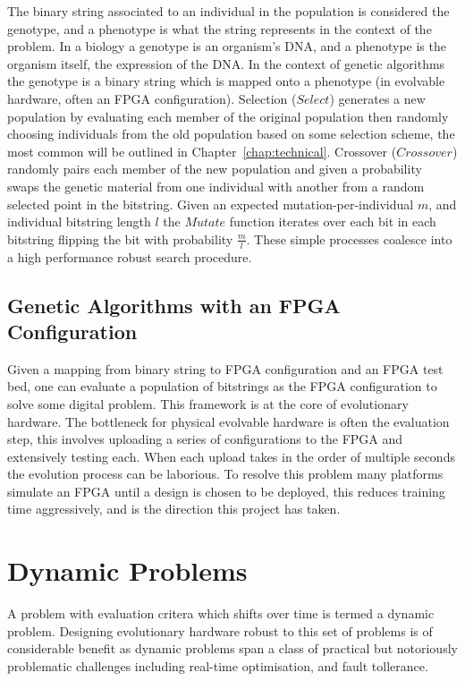 The binary string associated to an individual in the
population is considered the genotype, and a phenotype is what the string represents in the
context of the problem. In a biology a genotype is an organism's DNA, and a phenotype is
the organism itself, the expression of the DNA. In the context of genetic algorithms
the genotype is a binary string which is mapped onto a phenotype (in evolvable
hardware, often an FPGA configuration).
Selection ($Select$) generates a new population by evaluating each member of the
original population then
randomly choosing individuals from the old population based on some selection scheme,
the most common will be outlined in Chapter~\ref{chap:technical}.
Crossover ($Crossover$) randomly pairs each member of the new population
and given a probability swaps the genetic material from one individual with another from a
random selected point in the bitstring. Given an expected mutation-per-individual $m$, and
individual bitstring length
$l$ the $Mutate$ function iterates over each bit in each bitstring flipping the bit with
probability $\frac{m}{l}$. These simple processes coalesce into a high performance robust search
procedure.

\subsection{Genetic Algorithms with an FPGA Configuration}
Given a mapping from binary string to FPGA configuration and an FPGA test bed, one can
evaluate a population of bitstrings as the FPGA configuration to solve some digital
problem. This framework is at the core of evolutionary hardware. The bottleneck for physical evolvable
hardware is often the evaluation step, this involves uploading a series of configurations
to the FPGA and extensively testing each. When each upload takes in the order of
multiple seconds the evolution process can be laborious. To resolve this problem
many platforms simulate an FPGA until a design is chosen to be deployed, this reduces
training time aggressively, and is the direction this project has taken.

\section{Dynamic Problems}
A problem with evaluation critera which shifts over time is termed a dynamic problem. Designing
evolutionary hardware robust to this set of problems is of considerable benefit as
dynamic problems span a class of practical but notoriously problematic challenges including
real-time optimisation, and fault tollerance.

